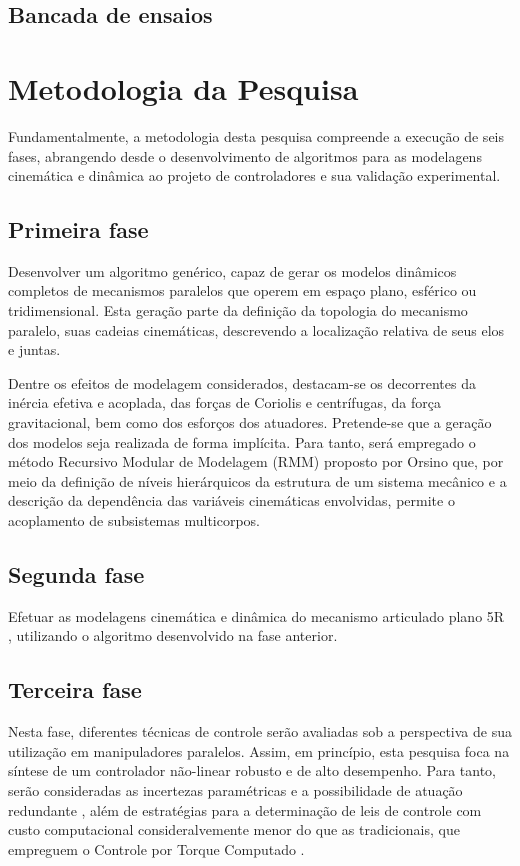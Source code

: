 \documentclass[]{politex}
\begin{document}
\section{Bancada de ensaios}

\chapter{Metodologia da Pesquisa}\label{method}

Fundamentalmente, a metodologia desta pesquisa compreende a execução de seis fases, abrangendo desde o desenvolvimento de algoritmos para as modelagens cinemática e dinâmica ao projeto de controladores e sua validação experimental.

\section{Primeira fase} 
Desenvolver um algoritmo genérico, capaz de gerar os modelos dinâmicos completos de mecanismos paralelos que operem em espaço plano, esférico ou tridimensional. Esta geração parte da definição da topologia do mecanismo paralelo, suas cadeias cinemáticas, descrevendo a localização relativa de seus elos e juntas. 

Dentre os efeitos de modelagem considerados, destacam-se os decorrentes da inércia efetiva e acoplada, das forças de Coriolis e centrífugas, da força gravitacional, bem como dos esforços dos atuadores. Pretende-se que a geração dos modelos seja realizada de forma implícita. Para tanto, será empregado o método Recursivo Modular de Modelagem (RMM) proposto por Orsino \cite{23orsino} que, por meio da definição de níveis hierárquicos da estrutura de um sistema mecânico e a descrição da dependência das variáveis cinemáticas envolvidas,  permite o acoplamento de subsistemas multicorpos.

\section{Segunda fase} 
Efetuar as modelagens cinemática e dinâmica do mecanismo articulado plano 5R \cite{22orsino}, utilizando o algoritmo desenvolvido na fase anterior.

\section{Terceira fase} 
Nesta fase, diferentes técnicas de controle serão avaliadas sob a perspectiva de sua utilização em manipuladores paralelos. Assim, 
em princípio, esta pesquisa foca na síntese de um controlador não-linear robusto e de alto desempenho. Para tanto, serão consideradas as incertezas paramétricas e a possibilidade de atuação redundante \cite{Cheng}, além de estratégias para a determinação de leis de controle com custo computacional
consideralvemente menor do que as tradicionais, que empreguem o Controle por Torque Computado \cite{Craig, Zubizarreta}.
\end{document}

